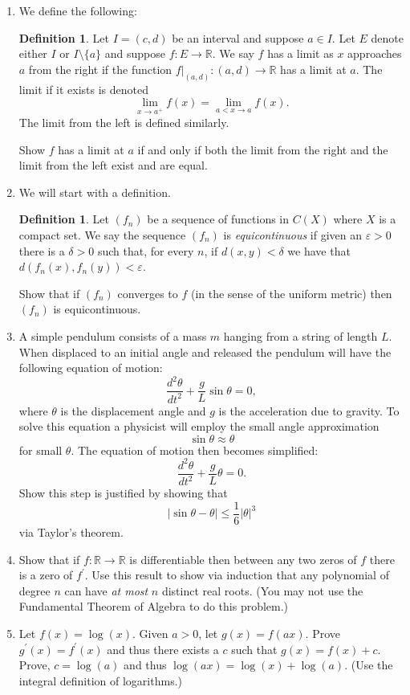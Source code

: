 \documentclass[12pt,letterpaper]{article}
\theoremstyle{plain}
\theoremstyle{definition}
\newtheorem{definition}[theorem]{Definition}
\begin{document}
\begin{enumerate}[1.]
\item We define the following:
\begin{definition}
Let $I=(c,d)$ be an interval and suppose $a\in I$. Let $E$ denote either $I$ or $I\setminus\{a\}$ and suppose $f:E\rightarrow \mathbb{R}$. We say $f$ has a limit as $x$ approaches $a$ from the right if the function $f|_{(a,d)}:(a,d)\rightarrow \mathbb{R}$ has a limit at $a$. The limit if it exists is denoted 
\[\lim_{x\rightarrow a^+}f(x)=\lim_{a<x\rightarrow a}f(x).\] The limit from the left is defined similarly. 
\end{definition}
Show $f$ has a limit at $a$ if and only if both the limit from the right and the limit from the left exist and are equal. 
\item We will start with a definition. 
\begin{definition}
 Let $(f_n)$ be a sequence of functions in $C(X)$ where $X$ is a compact set. We say the sequence $(f_n)$ is \emph{equicontinuous} if given an $\varepsilon>0$ there is a $\delta>0$ such that, for every $n$, if $d(x,y)<\delta$ we have that $d(f_n(x), f_n(y))<\varepsilon$. 
 \end{definition}
Show that if $(f_n)$ converges to $f$ (in the sense of the uniform metric) then $(f_n)$ is equicontinuous. 
\item A simple pendulum consists of a mass $m$ hanging from a string of length $L$. When displaced to an initial angle and released the pendulum will have the following equation of motion:
\[\dfrac{d^2\theta}{dt^2}+\dfrac{g}{L}\sin \theta=0,\]
where $\theta$ is the displacement angle and $g$ is the acceleration due to gravity. To solve this equation a physicist will employ the small angle approximation
\[\sin \theta \approx \theta \] for small $\theta$. The equation of motion then becomes simplified:
\[\dfrac{d^2\theta}{dt^2}+\dfrac{g}{L}\theta=0.\]
Show this step is justified by showing that 
\[|\sin \theta -\theta|\leq \frac{1}{6}|\theta|^{3}\]
via Taylor's theorem. 
\item Show that if $f:\mathbb{R}\rightarrow \mathbb{R}$ is differentiable then between any two zeros of $f$ there is a zero of $f^\prime$. Use this result to show via induction that any polynomial of degree $n$ can have \emph{at most} $n$ distinct real roots. (You may not use the Fundamental Theorem of Algebra to do this problem.)
\item Let $f(x)=\log(x)$. Given $a>0$, let $g(x)=f(ax)$. Prove $g^\prime(x)=f^\prime(x)$ and thus there exists a $c$ such that $g(x)=f(x)+c$. Prove, $c=\log(a)$ and thus $\log(ax)=\log(x)+\log(a)$. (Use the integral definition of logarithms.)
\end{enumerate}
\end{document}
